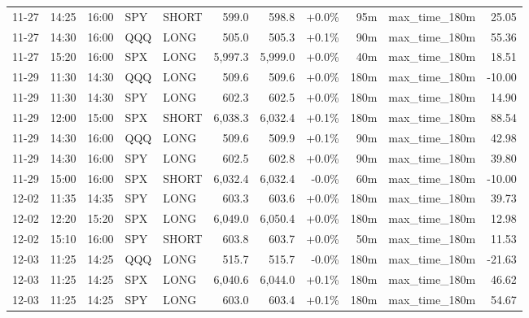 \documentclass[11pt,a4paper,twoside]{article}
\begin{document}
\begin{center}
\begin{longtable}{>{\color{txtmain}}l l l l l r r r r >{\color{txtmain}}l r}
11-27 & 14:25 & 16:00 & SPY & SHORT & 599.0 & 598.8 & \textcolor{wingreen}{+0.0\%} & 95m & max\_time\_180m & \textcolor{wingreen}{25.05} \\
11-27 & 14:30 & 16:00 & QQQ & LONG & 505.0 & 505.3 & \textcolor{wingreen}{+0.1\%} & 90m & max\_time\_180m & \textcolor{wingreen}{55.36} \\
11-27 & 15:20 & 16:00 & SPX & LONG & 5,997.3 & 5,999.0 & \textcolor{wingreen}{+0.0\%} & 40m & max\_time\_180m & \textcolor{wingreen}{18.51} \\
11-29 & 11:30 & 14:30 & QQQ & LONG & 509.6 & 509.6 & \textcolor{wingreen}{+0.0\%} & 180m & max\_time\_180m & \textcolor{lossred}{-10.00} \\
11-29 & 11:30 & 14:30 & SPY & LONG & 602.3 & 602.5 & \textcolor{wingreen}{+0.0\%} & 180m & max\_time\_180m & \textcolor{wingreen}{14.90} \\
11-29 & 12:00 & 15:00 & SPX & SHORT & 6,038.3 & 6,032.4 & \textcolor{wingreen}{+0.1\%} & 180m & max\_time\_180m & \textcolor{wingreen}{88.54} \\
11-29 & 14:30 & 16:00 & QQQ & LONG & 509.6 & 509.9 & \textcolor{wingreen}{+0.1\%} & 90m & max\_time\_180m & \textcolor{wingreen}{42.98} \\
11-29 & 14:30 & 16:00 & SPY & LONG & 602.5 & 602.8 & \textcolor{wingreen}{+0.0\%} & 90m & max\_time\_180m & \textcolor{wingreen}{39.80} \\
11-29 & 15:00 & 16:00 & SPX & SHORT & 6,032.4 & 6,032.4 & \textcolor{wingreen}{-0.0\%} & 60m & max\_time\_180m & \textcolor{lossred}{-10.00} \\
12-02 & 11:35 & 14:35 & SPY & LONG & 603.3 & 603.6 & \textcolor{wingreen}{+0.0\%} & 180m & max\_time\_180m & \textcolor{wingreen}{39.73} \\
12-02 & 12:20 & 15:20 & SPX & LONG & 6,049.0 & 6,050.4 & \textcolor{wingreen}{+0.0\%} & 180m & max\_time\_180m & \textcolor{wingreen}{12.98} \\
12-02 & 15:10 & 16:00 & SPY & SHORT & 603.8 & 603.7 & \textcolor{wingreen}{+0.0\%} & 50m & max\_time\_180m & \textcolor{wingreen}{11.53} \\
12-03 & 11:25 & 14:25 & QQQ & LONG & 515.7 & 515.7 & \textcolor{lossred}{-0.0\%} & 180m & max\_time\_180m & \textcolor{lossred}{-21.63} \\
12-03 & 11:25 & 14:25 & SPX & LONG & 6,040.6 & 6,044.0 & \textcolor{wingreen}{+0.1\%} & 180m & max\_time\_180m & \textcolor{wingreen}{46.62} \\
12-03 & 11:25 & 14:25 & SPY & LONG & 603.0 & 603.4 & \textcolor{wingreen}{+0.1\%} & 180m & max\_time\_180m & \textcolor{wingreen}{54.67} \\

\end{longtable}
\end{center}
\end{document}
